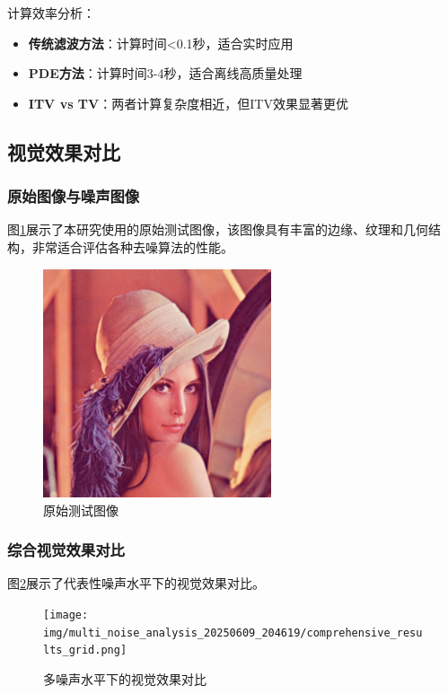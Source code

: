 \documentclass[a4paper,12pt]{ctexart}
\begin{document}
计算效率分析：
\begin{itemize}
    \item \textbf{传统滤波方法}：计算时间<0.1秒，适合实时应用
    \item \textbf{PDE方法}：计算时间3-4秒，适合离线高质量处理
    \item \textbf{ITV vs TV}：两者计算复杂度相近，但ITV效果显著更优
\end{itemize}

\subsection{视觉效果对比}

\subsubsection{原始图像与噪声图像}

图\ref{fig:original}展示了本研究使用的原始测试图像，该图像具有丰富的边缘、纹理和几何结构，非常适合评估各种去噪算法的性能。

\begin{figure}[H]
\centering
\includegraphics[width=0.6\textwidth]{img/multi_noise_analysis_20250609_204619/00_original_image.png}
\caption{原始测试图像}
\label{fig:original}
\end{figure}

\subsubsection{综合视觉效果对比}

图\ref{fig:visual}展示了代表性噪声水平下的视觉效果对比。

\begin{figure}[H]
\centering
\texttt{[image: img/multi\_noise\_analysis\_20250609\_204619/comprehensive\_results\_grid.png]}
\caption{多噪声水平下的视觉效果对比}
\label{fig:visual}
\end{figure}
\end{document}
